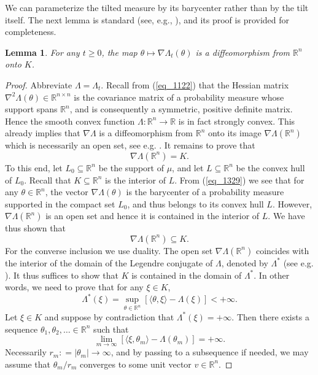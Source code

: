 \documentclass[12pt,a4paper]{article}
\newcommand{\RR}{\mathbb{R}}
\newcommand{\R}{\mathbb{R}}
\newtheorem{lemma}[theorem]{Lemma}
\theoremstyle{definition}
\begin{document}
We can parameterize the tilted measure by its barycenter rather than
by the tilt itself. The next lemma is standard (see, e.g., \cite[Lemma 2.1]{EK}), and its proof is provided
for completeness.
%
\begin{lemma} For any $t \geq 0$, the map $\theta \mapsto \nabla \Lambda_t(\theta)$ is a diffeomorphism from $\RR^n$ onto $K$.
\label{lem_1524}
\end{lemma}
%
\begin{proof}
Abbreviate $\Lambda =\Lambda_t$. 
Recall from (\ref{eq_1122}) that the Hessian matrix $\nabla^2 \Lambda(\theta) \in \RR^{n \times n}$ is the covariance matrix of a probability measure whose support spans $\RR^n$,
and is consequently a symmetric, positive definite matrix. Hence the smooth convex function 
$\Lambda: \RR^n \rightarrow \RR$ is in fact strongly convex. This already implies that
$\nabla \Lambda$ is a diffeomorphism from $\R^n$ onto
its image $\nabla \Lambda (\R^n)$ which is necessarily an open set, see e.g. \cite[section 26]{roc}.
It remains to
prove that $$ \nabla \Lambda (\R^n) = K. $$
To this end, let $L_0 \subseteq \RR^n$ be the support of $\mu$, and let $L \subseteq \RR^n$ be the  convex hull of $L_0$.
Recall that $K \subseteq \RR^n$ is the interior of $L$. 
From (\ref{eq_1329}) we see that for any $\theta \in \RR^n$, the vector $\nabla \Lambda(\theta)$ is the barycenter of a probability measure supported in the compact set $L_0$,
and thus belongs to its convex hull $L$. However, $\nabla \Lambda (\R^n)$ is an open set 
and hence it is contained in the interior of $L$. We have thus shown that $$ \nabla \Lambda (\R^n) \subseteq K. $$ For the converse inclusion
we use duality. The open set $\nabla \Lambda (\R^n)$
coincides with the interior of the domain of the Legendre conjugate of
$\Lambda$, denoted by $\Lambda^*$
(see e.g. \cite[Theorem 26.5]{roc}). It thus suffices to show that $K$
is contained in the domain of $\Lambda^*$.
In other words, we need to prove  that for any $\xi \in K$,
\[
\Lambda^* (\xi) = \sup_{\theta\in \R^n} \left[ \langle \theta ,\xi \rangle
 - \Lambda ( \xi ) \right] < + \infty.
\]
Let $\xi \in K$ and suppose by contradiction that
$\Lambda^* ( \xi ) = +\infty$.
Then there exists a sequence $\theta_1,\theta_2,\ldots \in \RR^n$ such that
\begin{equation}\label{eq_1525}
\lim_{m\to \infty}  \left[ \langle \xi , \theta_m \rangle - \Lambda (\theta_m) \right] = +\infty.
\end{equation}
Necessarily $r_m: =\vert \theta_m \vert \longrightarrow  \infty$,
and by passing to a subsequence if needed,
we may assume that $\theta_m / r_m$ converges to some unit
vector $v \in \RR^n$. 


\end{proof}
\end{document}
